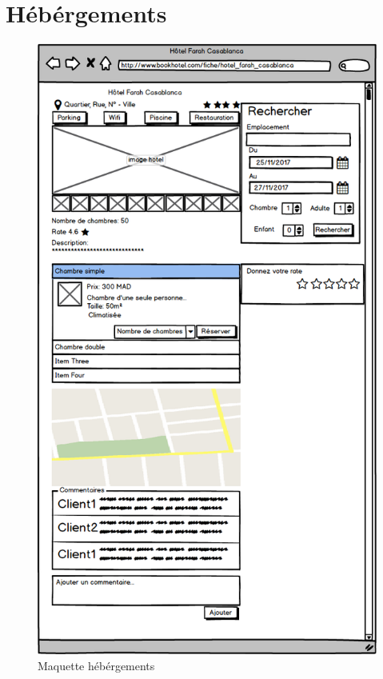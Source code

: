 \documentclass[12pt,a4paper]{report}
\begin{document}
	\newpage
	\section{Hébérgements}
	\begin{figure}[!hbtp]
		\centering
		\includegraphics[scale=0.4]{./graphics/9.png}
		\caption{Maquette hébérgements}
	\end{figure}
	
	\newpage
\end{document}
